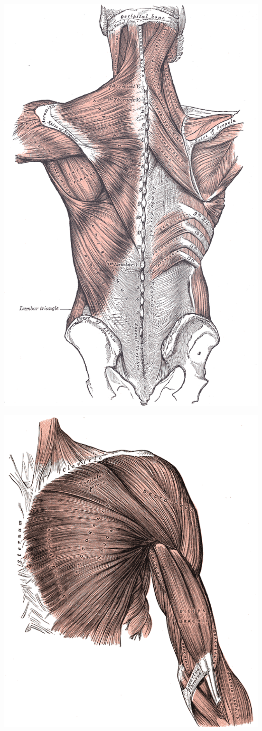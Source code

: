 \documentclass[pdftex,a4paper,11pt]{article}
\numberwithin{equation}{subsection}
\begin{document}
\begin{center}
        \includegraphics[width=.80\linewidth]{fig/Gray409}
\end{center}

\begin{center}
        \includegraphics[width=.80\linewidth]{fig/Gray410}
\end{center}
\end{document}
